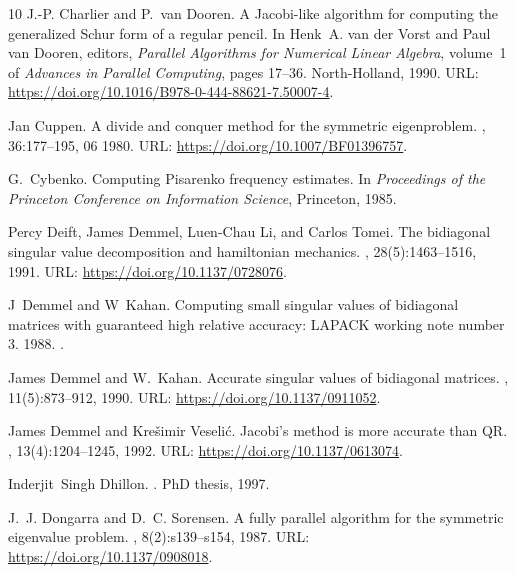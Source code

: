 \documentclass[10pt,twoside,dvipsnames]{siamart1116}
\numberwithin{algorithm}{section}
\numberwithin{equation}{section}
\begin{document}
\begin{thebibliography}{10}
J.-P. Charlier and P.~{van Dooren}.
\newblock A {J}acobi-like algorithm for computing the generalized {S}chur form
  of a regular pencil.
\newblock In Henk~A. {van der Vorst} and Paul {van Dooren}, editors, {\em
  Parallel Algorithms for Numerical Linear Algebra}, volume~1 of {\em Advances
  in Parallel Computing}, pages 17--36. North-Holland, 1990.
\newblock URL: \url{https://doi.org/10.1016/B978-0-444-88621-7.50007-4}.

Jan Cuppen.
\newblock A divide and conquer method for the symmetric eigenproblem.
, 36:177--195, 06 1980.
\newblock URL: \url{https://doi.org/10.1007/BF01396757}.

G.~Cybenko.
\newblock Computing {P}isarenko frequency estimates.
\newblock In {\em Proceedings of the Princeton Conference on Information
  Science}, Princeton, 1985.

Percy Deift, James Demmel, Luen-Chau Li, and Carlos Tomei.
\newblock The bidiagonal singular value decomposition and hamiltonian
  mechanics.
, 28(5):1463--1516, 1991.
\newblock URL: \url{https://doi.org/10.1137/0728076}.

J~Demmel and W~Kahan.
\newblock Computing small singular values of bidiagonal matrices with
  guaranteed high relative accuracy: {LAPACK} working note number 3.
 1988.
\newblock \href {https://arxiv.org/abs/https://www.osti.gov/biblio/5039344}
  {}.

James Demmel and W.~Kahan.
\newblock Accurate singular values of bidiagonal matrices.
,
  11(5):873--912, 1990.
\newblock URL: \url{https://doi.org/10.1137/0911052}.

James Demmel and Kre\v{s}imir Veseli\'{c}.
\newblock Jacobi’s method is more accurate than {QR}.
,
  13(4):1204--1245, 1992.
\newblock URL: \url{https://doi.org/10.1137/0613074}.

Inderjit~Singh Dhillon.
.
\newblock PhD thesis, 1997.

J.~J. Dongarra and D.~C. Sorensen.
\newblock A fully parallel algorithm for the symmetric eigenvalue problem.
,
  8(2):s139--s154, 1987.
\newblock URL: \url{https://doi.org/10.1137/0908018}.


\end{thebibliography}
\end{document}

